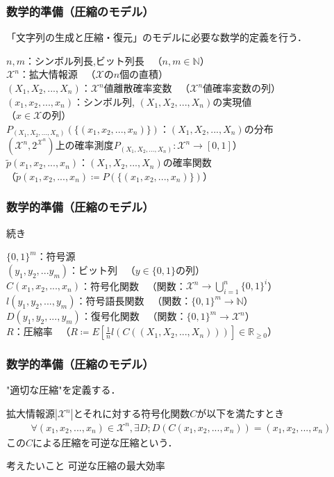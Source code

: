 \documentclass{classes/myslide}
\begin{document}
\begin{frame}\frametitle{数学的準備（圧縮のモデル）}
  「文字列の生成と圧縮・復元」のモデルに必要な数学的定義を行う．
  \begin{definition}[拡大情報源など]
    $n, m$：シンボル列長,ビット列長 \ （$n, m \in \mathbb{N}$）\\
    $\mathcal{X}^n$：拡大情報源 \ （$\mathcal{X}$の$n$個の直積）\\
    $(X_1, X_2, ..., X_n)$：$\mathcal{X}^n$値離散確率変数 \ （$\mathcal{X}^n$値確率変数の列）\\
    $(x_1, x_2, ..., x_n )$：シンボル列, $(X_1, X_2, ..., X_n)$の実現値  \\ \quad （$ x \in \mathcal{X}$の列）\\
    $P_{(X_1, X_2, ..., X_n)}(\{(x_1, x_2, ..., x_n )\})$：$(X_1, X_2, ..., X_n)$の分布 \\ \quad $(\mathcal{X}^n, 2^{{\mathcal{X}}^n})$上の確率測度$P_{(X_1, X_2, ..., X_n)}: \mathcal{X}^n \rightarrow [0, 1]$） \\
    $\tilde{p}(x_1, x_2, ..., x_n )$：$(X_1, X_2, ..., X_n)$の確率関数 \\ \quad（$\tilde{p}(x_1, x_2, ..., x_n ) \coloneq P(\{(x_1, x_2, ..., x_n )\})$）
  \end{definition}
\end{frame}

\begin{frame}\frametitle{数学的準備（圧縮のモデル）}
  続き
  \begin{definition}[拡大情報源など]
    $\{0, 1\}^m$：符号源 \\
    $(y_1, y_2,... y_m)$：ビット列 \ （$y \in \{0, 1\}$の列）\\
    $C(x_1, x_2, ..., x_n )$：符号化関数 \ （関数：$\mathcal{X}^n \rightarrow \bigcup_{i = 1}^n \{0, 1\}^i$）\\
    $l(y_1, y_2, ..., y_m )$：符号語長関数 \ （関数：$\{0, 1\}^m \rightarrow \mathbb{N}$） \\
    $D(y_1, y_2, ..., y_m )$：復号化関数  \ （関数：$\{0, 1\}^m \rightarrow \mathcal{X}^n$） \\
    $R$：圧縮率 \ （$R \coloneq E[\frac{1}{n}l(C((X_1, X_2, ..., X_n)))] \in \mathbb{R}_{\geq 0}$）
  \end{definition}
\end{frame}

\begin{frame}\frametitle{数学的準備（圧縮のモデル）}
  "適切な圧縮"を定義する．
  \begin{definition}[可逆な圧縮]
    拡大情報源$|\mathcal{X}^n|$とそれに対する符号化関数$C$が以下を満たすとき
    \begin{multline*}
      \forall (x_1, x_2, ..., x_n ) \in \mathcal{X}^n, \exists D;  D(C(x_1, x_2, ..., x_n )) = (x_1, x_2, ..., x_n )
    \end{multline*}
    この$C$による圧縮を可逆な圧縮という．
  \end{definition}
  \begin{alertblock}{考えたいこと}
    可逆な圧縮の最大効率
  \end{alertblock}
\end{frame}
\end{document}
